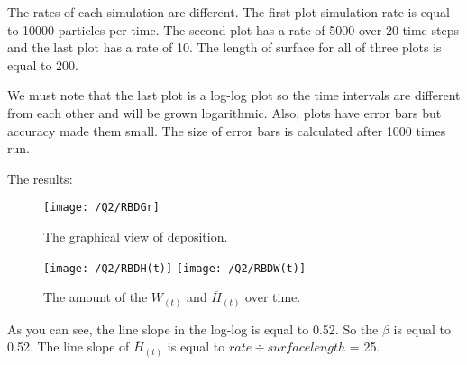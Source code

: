 \documentclass{article}
\begin{document}
    The rates of each simulation are different.
    The first plot simulation rate is equal to 10000 particles per time.
    The second plot has a rate of 5000 over 20 time-steps and the last plot has a rate of 10.
    The length of surface for all of three plots is equal to 200.


    We must note that the last plot is a log-log plot so the time intervals
    are different from each other and will be grown logarithmic.
    Also, plots have error bars but accuracy made them small.
    The size of error bars is calculated after 1000 times run.

    The results:

    \begin{figure}[!htb]
        \centering
        \texttt{[image: /Q2/RBDGr]}
        \label{fig:2.1}
        \caption{The graphical view of deposition.}
    \end{figure}
    \pagebreak
    \begin{figure}[!htb]
        \centering
        \texttt{[image: /Q2/RBDH(t)]}
        \label{fig:2.2}
        \texttt{[image: /Q2/RBDW(t)]}
        \label{fig:2.3}
        \caption{The amount of the $W_{(t)}$ and $\overline{H}_{(t)}$ over time.}
    \end{figure}

    As you can see, the line slope in the log-log is equal to 0.52. So the $\beta$ is equal to 0.52.
    The line slope of $\overline{H}_{(t)}$ is equal to $rate \div surface length$ = 25.
\end{document}
